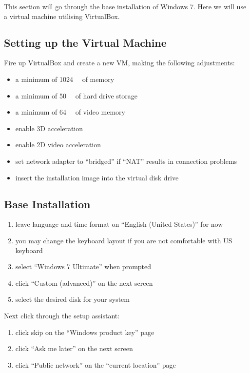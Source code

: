 \documentclass{itsarticle}
\begin{document}
This section will go through the base installation of Windows 7. Here we will
use a virtual machine utilising VirtualBox\footnotemark.


\subsection{Setting up the Virtual Machine}
\label{sub:virtual_box}

Fire up VirtualBox and create a new VM, making the following adjustments:

\begin{itemize}
    \item a minimum of \SI{1024}{\mega\byte} of memory
    \item a minimum of \SI{50}{\giga\byte} of hard drive storage
    \item a minimum of \SI{64}{\mega\byte} of video memory
    \item enable 3D acceleration
    \item enable 2D video acceleration
    \item set network adapter to ``bridged'' if ``NAT'' results in connection
        problems
    \item insert the installation image into the virtual disk drive
\end{itemize}

\subsection{Base Installation}
\label{sub:base_install}

\begin{enumerate}
    \item leave language and time format on ``English (United States)'' for now
    \item you may change the keyboard layout if you are not comfortable with US
        keyboard
    \item select ``Windows 7 Ultimate'' when prompted
    \item click ``Custom (advanced)'' on the next screen
    \item select the desired disk for your system
\end{enumerate}

Next click through the setup assistant:

\begin{enumerate}
    \item click skip on the ``Windows product key'' page
    \item click ``Ask me later'' on the next screen
    \item click ``Public network'' on the ``current location'' page
\end{enumerate}
\end{document}
